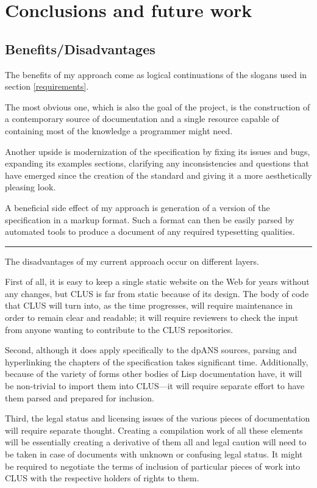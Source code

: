 \section{Conclusions and future work}

\subsection{Benefits/Disadvantages}

The benefits of my approach come as logical continuations of the slogans used in section \ref{requirements}.

The most obvious one, which is also the goal of the project, is the construction of a contemporary source of \cl{} documentation and a single resource capable of containing most of the knowledge a \cl{} programmer might need.

Another upside is modernization of the specification by fixing its issues and bugs, expanding its examples sections, clarifying any inconsistencies and questions that have emerged since the creation of the standard and giving it a more aesthetically pleasing look.

A beneficial side effect of my approach is generation of a version of the \cl{} specification in a markup format. Such a format can then be easily parsed by automated tools to produce a document of any required typesetting qualities.

\noindent\rule{\linewidth}{0.5pt}

The disadvantages of my current approach occur on different layers.

First of all, it is easy to keep a single static website on the Web for years without any changes, but CLUS is far from static because of its design. The body of code that CLUS will turn into, as the time progresses, will require maintenance in order to remain clear and readable; it will require reviewers to check the input from anyone wanting to contribute to the CLUS repositories.

Second, although it does apply specifically to the dpANS sources, parsing and hyperlinking the chapters of the specification takes significant time. Additionally, because of the variety of forms other bodies of Lisp documentation have, it will be non-trivial to import them into CLUS---it will require separate effort to have them parsed and prepared for inclusion.

Third, the legal status and licensing issues of the various pieces of documentation will require separate thought. Creating a compilation work of all these elements will be essentially creating a derivative of them all and legal caution will need to be taken in case of documents with unknown or confusing legal status. It might be required to negotiate the terms of inclusion of particular pieces of work into CLUS with the respective holders of rights to them.

